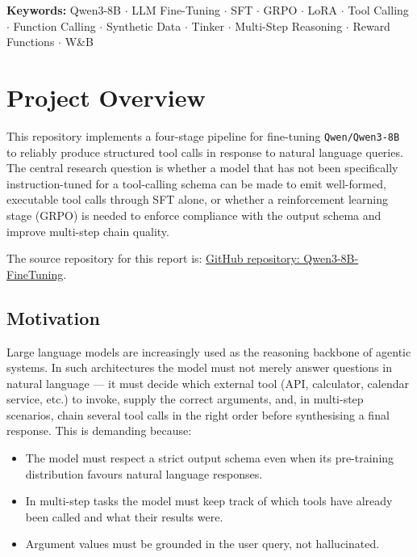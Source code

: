 \documentclass[12pt, a4paper]{article}
\begin{document}
\vspace{0.5cm}

\begin{center}
\small
\textbf{Keywords:} Qwen3-8B $\cdot$ LLM Fine-Tuning $\cdot$ SFT $\cdot$ GRPO $\cdot$ LoRA $\cdot$
Tool Calling $\cdot$ Function Calling $\cdot$ Synthetic Data $\cdot$ Tinker $\cdot$
Multi-Step Reasoning $\cdot$ Reward Functions $\cdot$ W\&B
\end{center}

\newpage
\onehalfspacing

\tableofcontents
\newpage

\section{Project Overview}

This repository implements a four-stage pipeline for fine-tuning
\texttt{Qwen/Qwen3-8B} to reliably produce structured tool calls in response
to natural language queries. The central research question is whether a model
that has not been specifically instruction-tuned for a tool-calling schema can
be made to emit well-formed, executable tool calls through SFT alone, or
whether a reinforcement learning stage (GRPO) is needed to enforce compliance
with the output schema and improve multi-step chain quality.

The source repository for this report is:
\href{https://github.com/dhruvanmurthy/Qwen3-8B-FineTuning}{GitHub repository: Qwen3-8B-FineTuning}.

\subsection{Motivation}

Large language models are increasingly used as the reasoning backbone of
agentic systems. In such architectures the model must not merely answer
questions in natural language --- it must decide which external tool (API,
calculator, calendar service, etc.) to invoke, supply the correct arguments,
and, in multi-step scenarios, chain several tool calls in the right order
before synthesising a final response. This is demanding because:

\begin{itemize}[leftmargin=1.5em, itemsep=4pt]
  \item The model must respect a strict output schema even when its pre-training
    distribution favours natural language responses.
  \item In multi-step tasks the model must keep track of which tools have
    already been called and what their results were.
  \item Argument values must be grounded in the user query, not hallucinated.
\end{itemize}
\end{document}
